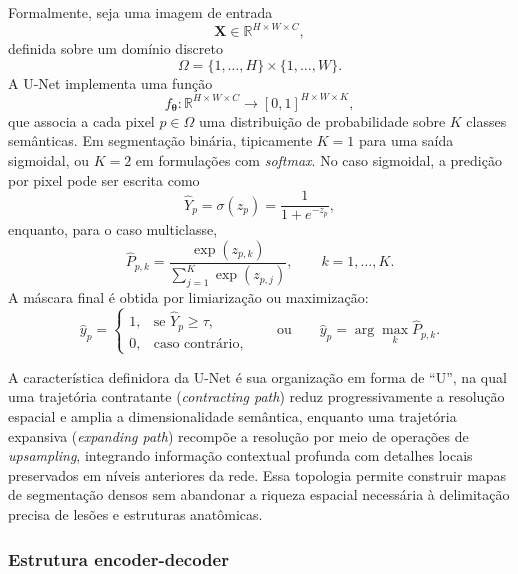 \documentclass[tcc,capa]{texufpel}
\begin{document}
Formalmente, seja uma imagem de entrada
\begin{equation}
	\mathbf{X} \in \mathbb{R}^{H \times W \times C},
\end{equation}
definida sobre um domínio discreto
\begin{equation}
	\Omega = \{1,\dots,H\}\times\{1,\dots,W\}.
\end{equation}
A U-Net implementa uma função
\begin{equation}
	f_{\boldsymbol{\theta}} : \mathbb{R}^{H \times W \times C} \rightarrow [0,1]^{H \times W \times K},
\end{equation}
que associa a cada pixel \(p \in \Omega\) uma distribuição de probabilidade sobre \(K\) classes semânticas. Em segmentação binária, tipicamente \(K=1\) para uma saída sigmoidal, ou \(K=2\) em formulações com \textit{softmax}. No caso sigmoidal, a predição por pixel pode ser escrita como
\begin{equation}
	\hat{Y}_{p} = \sigma(z_p) = \frac{1}{1 + e^{-z_p}},
\end{equation}
enquanto, para o caso multiclasse,
\begin{equation}
	\hat{P}_{p,k} = \frac{\exp(z_{p,k})}{\sum_{j=1}^{K}\exp(z_{p,j})},
	\qquad k=1,\dots,K.
\end{equation}
A máscara final é obtida por limiarização ou maximização:
\begin{equation}
	\hat{y}_p =
	\begin{cases}
		1, & \text{se } \hat{Y}_p \ge \tau,\\
		0, & \text{caso contrário},
	\end{cases}
	\qquad \text{ou} \qquad
	\hat{y}_p = \arg\max_k \hat{P}_{p,k}.
\end{equation}

A característica definidora da U-Net é sua organização em forma de ``U'', na qual uma trajetória contratante (\textit{contracting path}) reduz progressivamente a resolução espacial e amplia a dimensionalidade semântica, enquanto uma trajetória expansiva (\textit{expanding path}) recompõe a resolução por meio de operações de \textit{upsampling}, integrando informação contextual profunda com detalhes locais preservados em níveis anteriores da rede. Essa topologia permite construir mapas de segmentação densos sem abandonar a riqueza espacial necessária à delimitação precisa de lesões e estruturas anatômicas. 

\subsubsection{Estrutura encoder-decoder}
\end{document}
